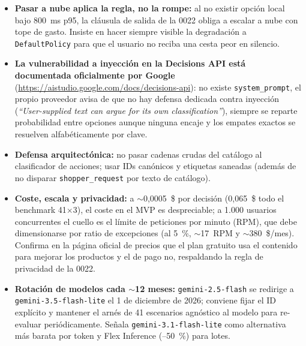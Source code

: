 \begin{tcolorbox}[colback=responsecolor, title=Insights de DeepSeek, colframe=gray!60!black, breakable]
	\begin{itemize}
		\item \textbf{Pasar a nube aplica la regla, no la rompe:} al no existir opción local bajo 800~ms p95, la cláusula de salida de la 0022 obliga a escalar a nube con tope de gasto. Insiste en hacer siempre visible la degradación a \texttt{DefaultPolicy} para que el usuario no reciba una cesta peor en silencio.

		\item \textbf{La vulnerabilidad a inyección en la Decisions API está documentada oficialmente por Google} (\url{https://aistudio.google.com/docs/decisions-api}): no existe \texttt{system\_prompt}, el propio proveedor avisa de que no hay defensa dedicada contra inyección (\textit{``User-supplied text can argue for its own classification''}), siempre se reparte probabilidad entre opciones aunque ninguna encaje y los empates exactos se resuelven alfabéticamente por clave.

		\item \textbf{Defensa arquitectónica:} no pasar cadenas crudas del catálogo al clasificador de acciones; usar IDs canónicos y etiquetas saneadas (además de no disparar \texttt{shopper\_request} por texto de catálogo).

		\item \textbf{Coste, escala y privacidad:} a $\sim$0,0005~\$ por decisión (0,065~\$ todo el benchmark 41$\times$3), el coste en el MVP es despreciable; a 1.000 usuarios concurrentes el cuello es el límite de peticiones por minuto (RPM), que debe dimensionarse por ratio de excepciones (al 5~\%, $\sim$17~RPM y $\sim$380~\$/mes). Confirma en la página oficial de precios que el plan gratuito usa el contenido para mejorar los productos y el de pago no, respaldando la regla de privacidad de la 0022.

		\item \textbf{Rotación de modelos cada $\sim$12 meses:} \texttt{gemini-2.5-flash} se redirige a \texttt{gemini-3.5-flash-lite} el 1 de diciembre de 2026; conviene fijar el ID explícito y mantener el arnés de 41 escenarios agnóstico al modelo para re-evaluar periódicamente. Señala \texttt{gemini-3.1-flash-lite} como alternativa más barata por token y Flex Inference (--50~\%) para lotes.
	\end{itemize}
\end{tcolorbox}

